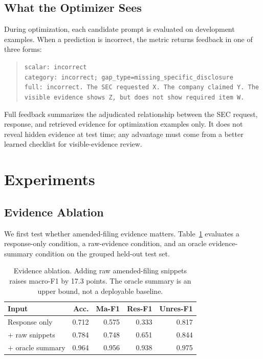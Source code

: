 \documentclass[11pt]{article}
\begin{document}
\subsection{What the Optimizer Sees}

During optimization, each candidate prompt is evaluated on development examples. When a prediction is incorrect, the metric returns feedback in one of three forms:
\begin{quote}
\small
\texttt{scalar: incorrect}\\
\texttt{category: incorrect; gap\_type=missing\_specific\_disclosure}\\
\texttt{full: incorrect. The SEC requested X. The company claimed Y. The visible evidence shows Z, but does not show required item W.}
\end{quote}
Full feedback summarizes the adjudicated relationship between the SEC request, response, and retrieved evidence for optimization examples only. It does not reveal hidden evidence at test time; any advantage must come from a better learned checklist for visible-evidence review.

\section{Experiments}

\subsection{Evidence Ablation}

We first test whether amended-filing evidence matters. Table~\ref{tab:evidence} evaluates a response-only condition, a raw-evidence condition, and an oracle evidence-summary condition on the grouped held-out test set.

\begin{table}[t]
\centering
\scriptsize
\setlength{\tabcolsep}{3pt}
\begin{tabular}{lrrrr}
\toprule
\textbf{Input} & \textbf{Acc.} & \textbf{Ma-F1} & \textbf{Res-F1} & \textbf{Unres-F1} \\
\midrule
Response only & 0.712 & 0.575 & 0.333 & 0.817 \\
+ raw snippets & 0.784 & 0.748 & 0.651 & 0.844 \\
+ oracle summary & 0.964 & 0.956 & 0.938 & 0.975 \\
\bottomrule
\end{tabular}
\caption{Evidence ablation. Adding raw amended-filing snippets raises macro-F1 by 17.3 points. The oracle summary is an upper bound, not a deployable baseline.}
\label{tab:evidence}
\end{table}
\end{document}
